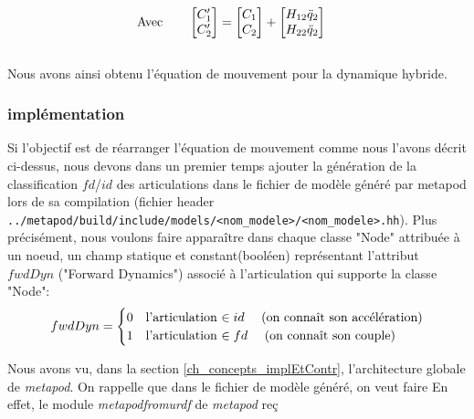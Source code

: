 \documentclass{report}
\begin{document}
\begin{align}
&\textnormal{Avec} \qquad
\begin{bmatrix}
  C'_{1} \\
  C'_{2}
\end{bmatrix}
=
\begin{bmatrix}
  C_{1} \\
  C_{2}
\end{bmatrix}
+
\begin{bmatrix}
  H_{12} \ddot{q}_2 \\
  H_{22} \ddot{q}_2
\end{bmatrix} \label{equ_cPrime}
\end{align}
\\
Nous avons ainsi obtenu l'équation de mouvement pour la dynamique hybride.

\subsubsection{implémentation}

Si l'objectif est de réarranger l'équation de mouvement comme nous l'avons décrit ci-dessus, nous devons dans un premier temps ajouter la génération de la classification $fd$/$id$ des articulations dans le fichier de modèle généré par metapod lors de sa compilation (fichier header \verb;../metapod/build/include/models/<nom_modele>/<nom_modele>.hh;). Plus précisément, nous voulons faire apparaître dans chaque classe "Node" attribuée à un noeud, un champ statique et constant\footnotemark[1] (booléen) représentant l'attribut $fwdDyn$ ("Forward Dynamics") associé à l'articulation qui supporte la classe "Node":
\begin{equation*}
fwdDyn = 
\begin{cases}
  0 & \textnormal{l'articulation $\in id \quad$ (on connaît son accélération)} \\
  1 & \textnormal{l'articulation $\in fd \quad$ (on connaît son couple)}
\end{cases}
\end{equation*}




Nous avons vu, dans la section \ref{ch_concepts_implEtContr}, l'architecture globale de \emph{metapod}. On rappelle que dans le fichier de modèle généré, on veut faire En effet, le module \emph{metapodfromurdf} de \emph{metapod} reç
\end{document}
